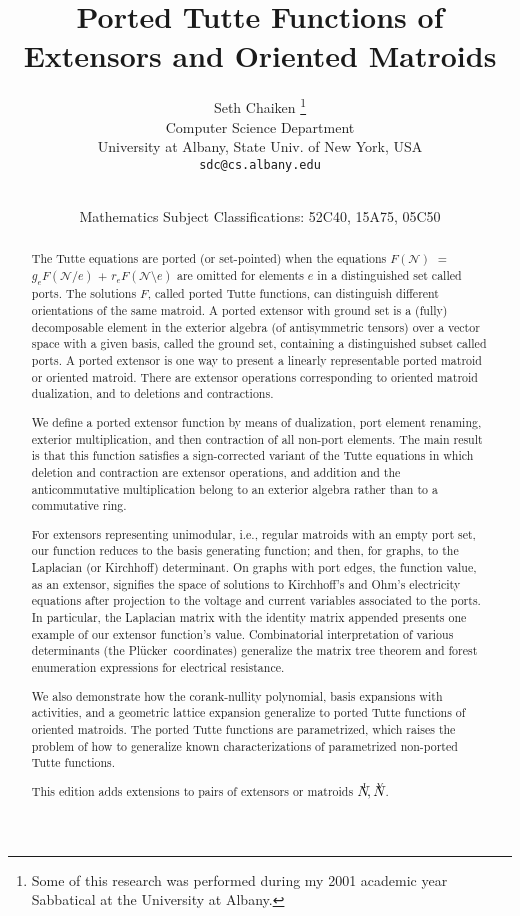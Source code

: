 \documentclass[12pt]{article}
\title{Ported Tutte Functions of Extensors and Oriented Matroids}
\author{Seth Chaiken
\thanks{Some of this research was 
performed during my 2001 academic year 
Sabbatical at the University at Albany.}\\
\small Computer Science Department\\[-0.8ex]
\small University at Albany, State Univ. of New York, USA\\[-0.8ex]
\small \texttt{sdc@cs.albany.edu}
}
\date{
\small \comment{Formatted:\today/ } \\
\small Mathematics Subject Classifications: 52C40, 15A75, 05C50}
\theoremstyle{definition}
\newcommand{\Plucker}{Pl\"{u}cker\ }
\newcommand{\NI}{\ensuremath{N^{\raisebox{2pt}{\tiny\hspace{-5.2pt}I}}}}
\newcommand{\NV}{\ensuremath{N^{\raisebox{2pt}{\tiny\hspace{-6.6pt}V}}}}
\begin{document}
\maketitle

\begin{abstract}
The Tutte equations are ported (or set-pointed) when the equations
$F(\mathcal{N})$ $=$ $g_eF(\mathcal{N}/e)$ $+$ 
$r_eF(\mathcal{N}\setminus e)$ are 
omitted for elements $e$ in a distinguished set
called ports.
The solutions $F$, called ported Tutte
functions, can distinguish different orientations of the same matroid. 
A ported extensor with ground set is a (fully) decomposable element
in the exterior algebra (of antisymmetric tensors) over a vector space with
a given basis, called the ground set, containing a distinguished subset 
called ports.  A ported extensor is one way to present a linearly 
representable ported matroid or oriented matroid.  There are extensor operations
corresponding to oriented matroid dualization, and to deletions and
contractions.

We define a ported extensor function by means of dualization, 
port element renaming, exterior multiplication, 
and then contraction of all non-port elements.  The main result is
that this function  satisfies 
a sign-corrected variant of the Tutte equations in which deletion
and contraction are extensor operations, and addition and 
the anticommutative multiplication belong to an exterior algebra
rather than to a commutative ring.

For extensors representing unimodular, i.e., regular
matroids with an empty port set, our function reduces to the basis
generating function; and then, for graphs, to the Laplacian (or
Kirchhoff) determinant.  On graphs with port edges, the function
value, as an extensor, signifies the space of solutions to Kirchhoff's
and Ohm's electricity equations after projection to the voltage and
current variables associated to the ports.  
In
particular, the Laplacian matrix with the identity matrix appended 
presents one example of our extensor function's value.  
Combinatorial interpretation
of various determinants (the \Plucker coordinates) generalize 
the matrix tree theorem and forest enumeration expressions for 
electrical resistance.  

We also demonstrate how the corank-nullity polynomial, basis expansions
with activities, and a geometric lattice expansion generalize to 
ported Tutte functions of oriented matroids.  The ported 
Tutte functions are parametrized, which raises 
the problem of how to generalize known characterizations
of parametrized non-ported Tutte functions.

This edition adds extensions to pairs of extensors or matroids
$\NI,\NV$.

\end{abstract}
\end{document}
